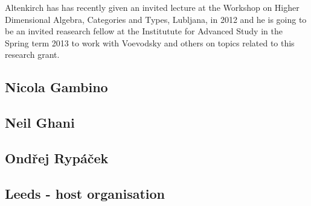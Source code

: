 \documentclass[twocolumn,a4paper,11pt]{article}
\newcommand{\Rypacek}{Ryp\'a\v{c}ek}
\newcommand{\Ondrej}{Ond\v{r}ej}
\begin{document}
Altenkirch has has recently given an invited lecture at the Workshop on
Higher Dimensional Algebra, Categories and Types, Lubljana, in 2012
and he is going to be an invited reasearch fellow at the
Institutute for Advanced Study in the Spring term 2013 to work with
Voevodsky and others on topics related to this research grant.
 



\subsection*{Nicola Gambino}

\subsection*{Neil Ghani}

\subsection*{{\Ondrej} {\Rypacek}}

\subsection*{Leeds - host organisation}
\end{document}
